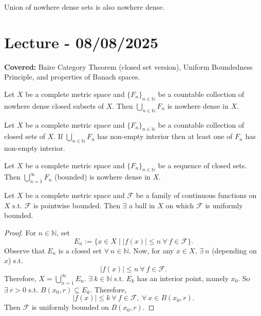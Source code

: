 \documentclass{functionspaces}
\begin{document}
\begin{theorem}
Union of nowhere dense sets is also nowhere dense.
\end{theorem}

\endgroup


\newpage
\section{Lecture - 08/08/2025}

\textbf{Covered:} Baire Category Theorem (closed set version), Uniform Boundedness Principle, and properties of Banach spaces.

\begingroup
\setlength{\parskip}{6pt}
\setlength{\parindent}{0pt}

\begin{theorem}
Let $X$ be a complete metric space and $\{F_{n}\}_{n\in\mathbb{N}}$ be a countable collection of nowhere dense closed subsets of $X$. Then $\bigcup_{n\in\mathbb{N}}F_{n}$ is nowhere dense in $X$.
\end{theorem}

\begin{corollary}
Let $X$ be a complete metric space and $\{F_{n}\}_{n\in\mathbb{N}}$ be a countable collection of closed sets of $X$. If $\bigcup_{n\in\mathbb{N}}F_{n}$ has non-empty interior then at least one of $F_{n}$ has non-empty interior.
\end{corollary}

\begin{corollary}
Let $X$ be a complete metric space and $\{F_{n}\}_{n\in\mathbb{N}}$ be a sequence of closed sets. Then $\bigcup_{n=1}^{\infty}F_{n}$ (bounded) is nowhere dense in $X$.
\end{corollary}

\begin{theorem}
Let $X$ be a complete metric space and $\mathcal{F}$ be a family of continuous functions on $X$ s.t. $\mathcal{F}$ is pointwise bounded. Then $\exists$ a ball in $X$ on which $\mathcal{F}$ is uniformly bounded.
\end{theorem}

\begin{proof}
For $n\in\mathbb{N}$, set
\[
E_{n}:=\{x\in X\mid|f(x)|\leq n\ \forall\ f\in\mathcal{F}\}.
\]
Observe that $E_{n}$ is a closed set $\forall\ n\in\mathbb{N}$. Now, for any $x\in X$, $\exists\ n$ (depending on $x$) s.t.
\[
|f(x)|\leq n\ \forall\ f\in\mathcal{F}.
\]
Therefore, $X=\bigcup_{n=1}^{\infty}E_{n}$. $\exists\ k\in\mathbb{N}$ s.t. $E_{k}$ has an interior point, namely $x_{0}$. So $\exists\ r>0$ s.t. $B(x_{0},r)\subseteq E_{k}$. Therefore,
\[
|f(x)|\leq k\ \forall\ f\in\mathcal{F},\ \forall\ x\in B(x_{0},r).
\]
Then $\mathcal{F}$ is uniformly bounded on $B(x_{0},r)$.
\end{proof}
\end{document}
